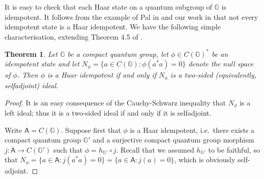 \documentclass[12pt]{amsart}
\newtheorem{theorem}{Theorem}[section]
\theoremstyle{definition}
\theoremstyle{remark}
\numberwithin{equation}{section}
\begin{document}
It is easy to check that each Haar state on a quantum subgroup of ${\mathbb{G}}$ is idempotent. It
follows from the example of Pal in \cite{pal96} and our work in \cite{franz+skalski08a} that not
every idempotent state is a Haar idempotent. We have the following simple characterisation,
extending Theorem 4.5 of \cite{franz+skalski08a}.

\begin{theorem}
Let ${\mathbb{G}}$ be a compact quantum group, let $\phi\in C({\mathbb{G}})^*$ be an idempotent state and let $N_{\phi} = \{a \in C({\mathbb{G}}) : \phi (a^*a)
=0\}$ denote the null space of $\phi$. Then $\phi$ is a Haar idempotent if and only if $N_{\phi}$ is a two-sided (equivalently,
selfadjoint) ideal.
\end{theorem}

\begin{proof}
It is an easy consequence of the Cauchy-Schwarz inequality that $N_{\phi}$ is a left ideal; thus it is a two-sided ideal if and
only if it is selfadjoint.

Write $\mathsf{A}=C({\mathbb{G}})$.
Suppose first that $\phi$ is a Haar idempotent, i.e.\ there exists a compact quantum group ${\mathbb{G}}'$ and a surjective compact
quantum group morphism $j:\mathsf{A} \to C({\mathbb{G}}')$ such that $\phi = h_{{\mathbb{G}}'} \circ j$. Recall that we assumed $h_{{\mathbb{G}}'}$ to be faithful,
so that $N_{\phi} = \{a \in \mathsf{A}: j(a^*a)=0\}=\{a\in \mathsf{A}: j(a) =0\}$, which is obviously self-adjoint.


\end{proof}
\end{document}
